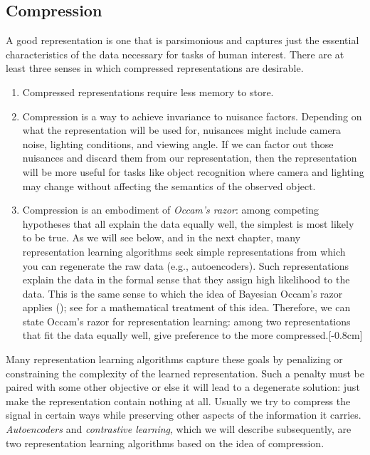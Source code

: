 \subsection{Compression}
A good representation is one that is parsimonious and captures just the essential characteristics of the data necessary for tasks of human interest. There are at least three senses in which compressed representations are desirable.
\begin{enumerate}
    \item Compressed representations require less memory to store.
    \item Compression is a way to achieve invariance to nuisance factors. Depending on what the representation will be used for, nuisances might include camera noise, lighting conditions, and viewing angle. If we can factor out those nuisances and discard them from our representation, then the representation will be more useful for tasks like object recognition where camera and lighting may change without affecting the semantics of the observed object.
    \item Compression is an embodiment of \textit{Occam's razor}: among competing hypotheses that all explain the data equally well, the simplest is most likely to be true. As we will see below, and in the next chapter, many representation learning algorithms seek simple representations from which you can regenerate the raw data (e.g., autoencoders). Such representations explain the data in the formal sense that they assign high likelihood to the data. This is the same sense to which the idea of Bayesian Occam's razor applies (\sect{\ref{sec:problem_of_generalization:star_problem_revisited}}); see \cite{mackay2003information} for a mathematical treatment of this idea. Therefore, we can state Occam's razor for representation learning: among two representations that fit the data equally well, give preference to the more compressed.[-0.8cm]
\end{enumerate}

Many representation learning algorithms capture these goals by penalizing or constraining the complexity of the learned representation. Such a penalty must be paired with some other objective or else it will lead to a degenerate solution: just make the representation contain nothing at all. Usually we try to compress the signal in certain ways while preserving other aspects of the information it carries. \textit{Autoencoders} and \textit{contrastive learning}, which we will describe subsequently, are two representation learning algorithms based on the idea of compression.

